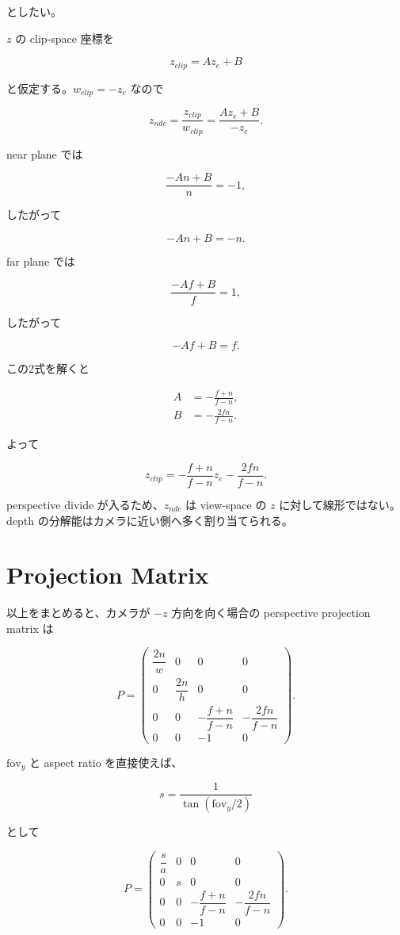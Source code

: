 \documentclass[a4paper,11pt]{ltjsarticle}
\begin{document}
としたい。

$z$ の clip-space 座標を

\[
  z_{clip}=Az_e+B
\]

と仮定する。$w_{clip}=-z_e$ なので

\[
  z_{ndc}
  =
  \frac{z_{clip}}{w_{clip}}
  =
  \frac{Az_e+B}{-z_e}.
\]

near plane では

\[
  \frac{-An+B}{n}=-1,
\]

したがって

\[
  -An+B=-n.
\]

far plane では

\[
  \frac{-Af+B}{f}=1,
\]

したがって

\[
  -Af+B=f.
\]

この2式を解くと

\begin{align*}
  A &= -\frac{f+n}{f-n},\\
  B &= -\frac{2fn}{f-n}.
\end{align*}

よって

\[
  z_{clip}
  =
  -\frac{f+n}{f-n}z_e
  -\frac{2fn}{f-n}.
\]

perspective divide が入るため、$z_{ndc}$ は view-space の $z$ に対して線形ではない。
depth の分解能はカメラに近い側へ多く割り当てられる。

\section{Projection Matrix}

以上をまとめると、カメラが $-z$ 方向を向く場合の perspective projection matrix は

\[
P=
\begin{pmatrix}
\dfrac{2n}{w} & 0 & 0 & 0 \\
0 & \dfrac{2n}{h} & 0 & 0 \\
0 & 0 & -\dfrac{f+n}{f-n} & -\dfrac{2fn}{f-n} \\
0 & 0 & -1 & 0
\end{pmatrix}.
\]

$\mathrm{fov}_y$ と aspect ratio を直接使えば、

\[
  s=\frac{1}{\tan(\mathrm{fov}_y/2)}
\]

として

\[
P=
\begin{pmatrix}
\dfrac{s}{a} & 0 & 0 & 0 \\
0 & s & 0 & 0 \\
0 & 0 & -\dfrac{f+n}{f-n} & -\dfrac{2fn}{f-n} \\
0 & 0 & -1 & 0
\end{pmatrix}.
\]
\end{document}
